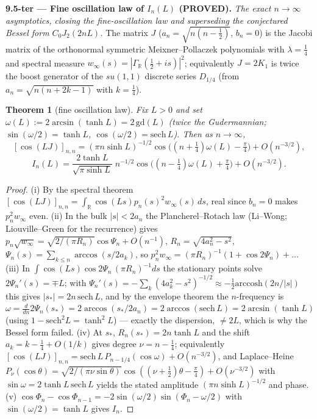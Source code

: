 \documentclass[11pt]{amsart}
\newtheorem{theorem}{Theorem}[section]
\theoremstyle{definition}
\theoremstyle{remark}
\newcommand{\PROVED}{\textbf{(PROVED)}}
\begin{document}
\medskip\noindent\textbf{9.5-ter --- Fine oscillation law of $I_n(L)$ \PROVED.}
\emph{The exact $n\to\infty$ asymptotics, closing the fine-oscillation law and superseding the
conjectured Bessel form $C_0J_2(2nL)$.} The matrix $J$ ($a_n=\sqrt{n(n-\tfrac12)}$, $b_n=0$)
is the Jacobi matrix of the orthonormal symmetric Meixner--Pollaczek polynomials with
$\lambda=\tfrac14$ and spectral measure $w_\infty(s)=|\Gamma_{\mathbb R}(\tfrac12+is)|^2$;
equivalently $J=2K_1$ is twice the boost generator of the $su(1,1)$ discrete series $D_{1/4}$
(from $a_n=\sqrt{n(n+2k-1)}$ with $k=\tfrac14$).
\begin{theorem}[fine oscillation law]\label{thm:95}
Fix $L>0$ and set $\omega(L):=2\arcsin(\tanh L)=2\,\mathrm{gd}(L)$ (twice the Gudermannian;
$\sin(\omega/2)=\tanh L$, $\cos(\omega/2)=\mathrm{sech}\,L$). Then as $n\to\infty$,
\[
[\cos(LJ)]_{n,n}=(\pi n\sinh L)^{-1/2}\cos\!\big((n+\tfrac14)\omega(L)-\tfrac\pi4\big)+O(n^{-3/2}),
\]
\[
I_n(L)=\frac{2\tanh L}{\sqrt{\pi\sinh L}}\;n^{-1/2}\cos\!\big((n-\tfrac14)\omega(L)+\tfrac\pi4\big)+O(n^{-3/2}).
\]
\end{theorem}
\begin{proof}
(i) By the spectral theorem $[\cos(LJ)]_{n,n}=\int_{\mathbb R}\cos(Ls)p_n(s)^2w_\infty(s)\,ds$,
real since $b_n=0$ makes $p_n^2w_\infty$ even. (ii) In the bulk $|s|<2a_n$ the Plancherel--Rotach
law (Li--Wong; Liouville--Green for the recurrence) gives
$p_n\sqrt{w_\infty}=\sqrt{2/(\pi R_n)}\cos\Psi_n+O(n^{-1})$, $R_n=\sqrt{4a_n^2-s^2}$,
$\Psi_n(s)=\sum_{k\le n}\arccos(s/2a_k)$, so $p_n^2w_\infty=(\pi R_n)^{-1}(1+\cos2\Psi_n)+\dots$
(iii) In $\int\cos(Ls)\cos2\Psi_n\,(\pi R_n)^{-1}ds$ the stationary points solve $2\Psi_n'(s)=\mp L$;
with $\Psi_n'(s)=-\sum_k(4a_k^2-s^2)^{-1/2}\approx-\tfrac12\mathrm{arccosh}(2n/|s|)$ this gives
$|s_*|=2n\,\mathrm{sech}\,L$, and by the envelope theorem the $n$-frequency is
$\omega=\tfrac{d}{dn}2\Psi_n(s_*)=2\arccos(s_*/2a_n)=2\arccos(\mathrm{sech}\,L)=2\arcsin(\tanh L)$
(using $1-\mathrm{sech}^2L=\tanh^2L$) --- exactly the dispersion, $\neq2L$, which is why the Bessel
form failed. (iv) At $s_*$, $R_n(s_*)=2n\tanh L$ and the shift $a_k=k-\tfrac14+O(1/k)$ gives degree
$\nu=n-\tfrac14$; equivalently $[\cos(LJ)]_{n,n}=\mathrm{sech}\,L\,P_{n-1/4}(\cos\omega)+O(n^{-3/2})$,
and Laplace--Heine $P_\nu(\cos\theta)=\sqrt{2/(\pi\nu\sin\theta)}\cos((\nu+\tfrac12)\theta-\tfrac\pi4)+O(\nu^{-3/2})$
with $\sin\omega=2\tanh L\,\mathrm{sech}\,L$ yields the stated amplitude $(\pi n\sinh L)^{-1/2}$ and
phase. (v) $\cos\Phi_n-\cos\Phi_{n-1}=-2\sin(\omega/2)\sin(\Phi_n-\omega/2)$ with
$\sin(\omega/2)=\tanh L$ gives $I_n$.
\end{proof}
\end{document}
